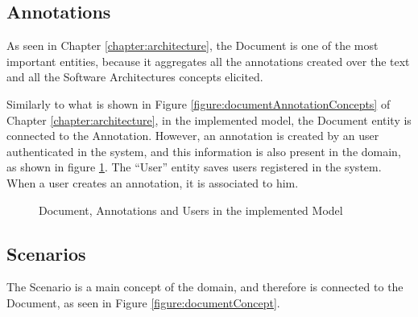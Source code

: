 \subsection{Annotations}
\label{subsection:modelAnnotations}
As seen in Chapter \ref{chapter:architecture}, the Document is one of the most important entities, because it aggregates all the annotations created over the text and all the Software Architectures concepts elicited.

Similarly to what is shown in Figure \ref{figure:documentAnnotationConcepts} of Chapter \ref{chapter:architecture}, in the implemented model, the Document entity is connected to the Annotation. However, an annotation is created by an user authenticated in the system, and this information is also present in the domain, as shown in figure \ref{figure:modelDocUserAnnot}. The ``User'' entity saves users registered in the system. When a user creates an annotation, it is associated to him.

\begin{figure}
\centering
\renewcommand {\umltextcolor}{black}
\renewcommand {\umlfillcolor}{none}
\renewcommand {\umldrawcolor}{black}

\caption{Document, Annotations and Users in the implemented Model}
\label{figure:modelDocUserAnnot}
\end{figure} 
 
\subsection{Scenarios}
\label{subsection:modelScenarios}
The Scenario is a main concept of the domain, and therefore is connected to the Document, as seen in Figure \ref{figure:documentConcept}. 

